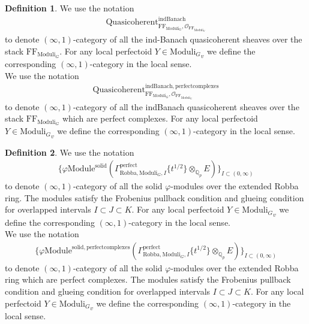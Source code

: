 \documentclass[12pt]{book}
\theoremstyle{definition}
\newtheorem{definition}{Definition}
\begin{document}
\begin{definition}
We use the notation
\begin{align}
\mathrm{Quasicoherent}^{\mathrm{indBanach}}_{\mathrm{FF}_{\mathrm{Moduli}_G},\mathcal{O}_{\mathrm{FF}_{\mathrm{Moduli}_G}}}
\end{align}
to denote $(\infty,1)$-category of all the ind-Banach quasicoherent sheaves over the stack $\mathrm{FF}_{\mathrm{Moduli}_G}$. For any local perfectoid $Y\in {\mathrm{Moduli}_G}_v$ we define the corresponding $(\infty,1)$-category in the local sense.\\
We use the notation
\begin{align}
\mathrm{Quasicoherent}^{\mathrm{indBanach,perfectcomplexes}}_{\mathrm{FF}_{\mathrm{Moduli}_G},\mathcal{O}_{\mathrm{FF}_{\mathrm{Moduli}_G}}}
\end{align}
to denote $(\infty,1)$-category of all the indBanach quasicoherent sheaves over the stack $\mathrm{FF}_{\mathrm{Moduli}_G}$ which are perfect complexes. For any local perfectoid $Y\in {\mathrm{Moduli}_G}_v$ we define the corresponding $(\infty,1)$-category in the local sense.
\end{definition}


\begin{definition}
We use the notation
\begin{align}
\{\varphi\mathrm{Module}^{\mathrm{solid}}(\Gamma^\text{perfect}_{\text{Robba},{\mathrm{Moduli}_G},I}\{t^{1/2}\}\otimes_{\mathbb{Q}_p}E)\}_{I\subset (0,\infty)}
\end{align}
to denote $(\infty,1)$-category of all the solid $\varphi$-modules over the extended Robba ring. The modules satisfy the Frobenius pullback condition and glueing condition for overlapped intervals $I\subset J\subset K$. For any local perfectoid $Y\in {\mathrm{Moduli}_G}_v$ we define the corresponding $(\infty,1)$-category in the local sense.\\
We use the notation
\begin{align}
\{\varphi\mathrm{Module}^{\mathrm{solid,perfectcomplexes}}(\Gamma^\text{perfect}_{\text{Robba},{\mathrm{Moduli}_G},I}\{t^{1/2}\}\otimes_{\mathbb{Q}_p}E)\}_{I\subset (0,\infty)}
\end{align}
to denote $(\infty,1)$-category of all the solid $\varphi$-modules over the extended Robba ring which are perfect complexes. The modules satisfy the Frobenius pullback condition and glueing condition for overlapped intervals $I\subset J\subset K$. For any local perfectoid $Y\in {\mathrm{Moduli}_G}_v$ we define the corresponding $(\infty,1)$-category in the local sense. 

\end{definition}
\end{document}
